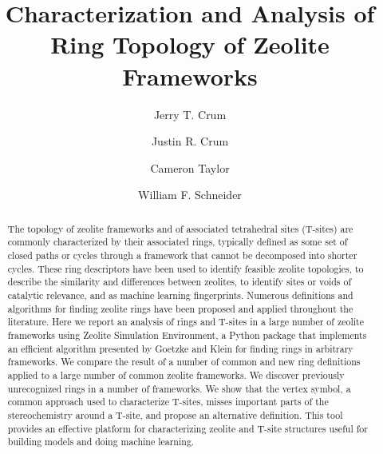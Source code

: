 \documentclass[preprint,numrefs,noinfo,sort&compress]{elsarticle}
\date{}
\title{}
\begin{document}
\frontmatter
\title{Characterization and Analysis of Ring Topology of Zeolite Frameworks}
\author[nd]{Jerry T. Crum}
\author[uoa]{Justin R. Crum}
\author[nd]{Cameron Taylor}
\author[nd,ndc]{William F. Schneider}
\address[nd]{Department of Chemical and Biomoledcular Engineering, University of Notre Dame, 250 Nieuwland Science Hall, Notre Dame, IN 46556, USA}
\address[uoa]{Department of Applied Mathematics, University of Arizona, 617 N Santa Rita Ave, Tucson, AZ 85721, USA}
\address[ndc]{Department of Chemistry and Biochemistry, University of Notre Dame, 251 Nieuwland Science Hall, Notre Dame, IN 46556, USA}
\begin{abstract}
The topology of zeolite frameworks and of associated tetrahedral sites (T-sites) are commonly characterized by their associated rings, typically defined as some set of closed paths or cycles through a framework that cannot be decomposed into shorter cycles. These ring descriptors have been used to identify feasible zeolite topologies, to describe the similarity and differences between zeolites, to identify sites or voids of catalytic relevance, and as machine learning fingerprints. Numerous definitions and algorithms for finding zeolite rings have been proposed and applied throughout the literature. Here we report an analysis of rings and T-sites in a large number of zeolite frameworks using Zeolite Simulation Environment, a Python package that implements an efficient algorithm presented by Goetzke and Klein for finding rings in arbitrary frameworks. We compare the result of a number of common and new ring definitions applied to a large number of common zeolite frameworks. We discover previously unrecognized rings in a number of frameworks. We show that the vertex symbol, a common approach used to characterize T-sites, misses important parts of the stereochemistry around a T-site, and propose an alternative definition. This tool provides an effective platform for characterizing zeolite and T-site structures useful for building models and doing machine learning.
\end{abstract}
\maketitle

\mainmatter
\end{document}
